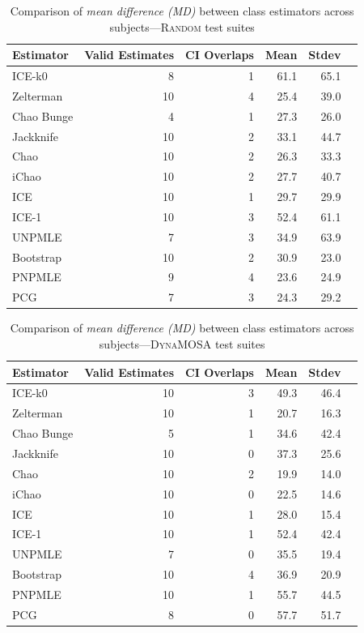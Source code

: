 \documentclass[sigconf,review,anonymous]{acmart}
\newcommand{\ICEallrare}{ICE-k0\xspace}
\newcommand{\Zelterman}{Zelterman\xspace}
\newcommand{\ChaoBunge}{Chao Bunge\xspace}
\newcommand{\Jackknife}{Jackknife\xspace}
\newcommand{\Chao}{Chao\xspace}
\newcommand{\improvedChao}{iChao\xspace}
\newcommand{\ICE}{ICE\xspace}
\newcommand{\improvedICE}{ICE-1\xspace}
\newcommand{\Unpmle}{UNPMLE\xspace}
\newcommand{\Bootstrap}{Bootstrap\xspace}
\newcommand{\Pnpmle}{PNPMLE\xspace}
\newcommand{\PCG}{PCG\xspace}
\newcommand{\EvosuiteRandom}{\textsc{Random}\xspace}
\newcommand{\EvosuiteDynamosa}{\textsc{DynaMOSA}\xspace}
\begin{document}
\begin{table}[t]
\caption{Comparison of \emph{mean difference (MD)} between class
estimators across subjects---\EvosuiteRandom test suites}
\begin{tabular}{|l|r|r|r|r|r|}
\hline
Estimator	&Valid Estimates	&CI Overlaps	&Mean	&Stdev	\\
\hline
\ICEallrare	&	8	&	1	&61.1	&	65.1\\
\Zelterman	&	10	&	4	&25.4	&	39.0\\
\ChaoBunge	&	4	&	1	&27.3	&	26.0\\
\Jackknife	&	10	&	2	&33.1	&	44.7\\
\Chao	&	10	&	2	&26.3	&	33.3\\
\improvedChao	&	10	&	2	&27.7	&	40.7\\
\ICE	&	10	&	1	&29.7	&	29.9\\
\improvedICE	&	10	&	3	&52.4	&	61.1\\
\Unpmle	&	7	&	3	&34.9	&	63.9\\
\Bootstrap	&	10	&	2	&30.9	&	23.0\\
\Pnpmle	&	9	&	4	&23.6	&	24.9\\
\PCG	&	7	&	3	&24.3	&	29.2\\
\hline
\end{tabular}
\label{tbl:estrandomclass}
\end{table}
\begin{table}[t]
\caption{Comparison of \emph{mean difference (MD)} between class
estimators across subjects---\EvosuiteDynamosa test suites}
\begin{tabular}{|l|r|r|r|r|r|}
\hline
Estimator	&Valid Estimates	&CI Overlaps	&Mean	&Stdev	\\
\hline
\ICEallrare	&	10	&	3	&49.3	&	46.4\\
\Zelterman	&	10	&	1	&20.7	&	16.3\\
\ChaoBunge	&	5	&	1	&34.6	&	42.4\\
\Jackknife	&	10	&	0	&37.3	&	25.6\\
\Chao	&	10	&	2	&19.9	&	14.0\\
\improvedChao	&	10	&	0	&22.5	&	14.6\\
\ICE	&	10	&	1	&28.0	&	15.4\\
\improvedICE	&	10	&	1	&52.4	&	42.4\\
\Unpmle	&	7	&	0	&35.5	&	19.4\\
\Bootstrap	&	10	&	4	&36.9	&	20.9\\
\Pnpmle	&	10	&	1	&55.7	&	44.5\\
\PCG	&	8	&	0	&57.7	&	51.7\\
\hline
\end{tabular}
\label{tbl:estdynamosaclass}
\end{table}
\end{document}
